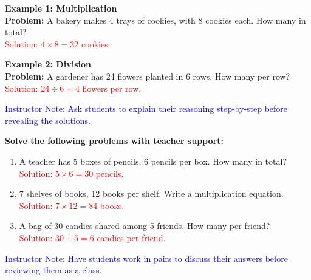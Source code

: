 \documentclass[12pt]{article}
\begin{document}
\begin{tcolorbox}[colframe=black!60, colback=white, 
coltitle=black, colbacktitle=black!15, fonttitle=\bfseries\Large, 
title=Examples, halign title=center, left=10pt, right=10pt, top=10pt, bottom=15pt]
\textbf{Example 1: Multiplication} \\
\textbf{Problem:} A bakery makes 4 trays of cookies, with 8 cookies each. How many in total? \\\textcolor{red}{Solution: $4 \times 8 = 32$ cookies.}

\textbf{Example 2: Division} \\
\textbf{Problem:} A gardener has 24 flowers planted in 6 rows. How many per row? \\\textcolor{red}{Solution: $24 \div 6 = 4$ flowers per row.}

\textcolor{blue}{Instructor Note: Ask students to explain their reasoning step-by-step before revealing the solutions.}
\end{tcolorbox}

\begin{tcolorbox}[colframe=black!60, colback=white, 
coltitle=black, colbacktitle=black!15, fonttitle=\bfseries\Large, 
title=Guided Practice, halign title=center, left=10pt, right=10pt, top=10pt, bottom=80pt]
\textbf{Solve the following problems with teacher support:}
\begin{enumerate}[itemsep=5em]
    \item A teacher has 5 boxes of pencils, 6 pencils per box. How many in total? \\\textcolor{red}{Solution: $5 \times 6 = 30$ pencils.}
    \item 7 shelves of books, 12 books per shelf. Write a multiplication equation. \\\textcolor{red}{Solution: $7 \times 12 = 84$ books.}
    \item A bag of 30 candies shared among 5 friends. How many per friend? \\\textcolor{red}{Solution: $30 \div 5 = 6$ candies per friend.}
\end{enumerate}

\textcolor{blue}{Instructor Note: Have students work in pairs to discuss their answers before reviewing them as a class.}
\end{tcolorbox}
\end{document}
